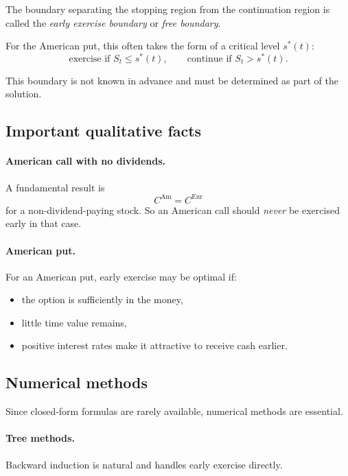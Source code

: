 \documentclass[11pt]{article}
\newcommand{\1}{\mathbf{1}}
\theoremstyle{plain}
\theoremstyle{definition}
\theoremstyle{remark}
\begin{document}
The boundary separating the stopping region from the continuation region is called the
\emph{early exercise boundary} or \emph{free boundary}.

For the American put, this often takes the form of a critical level \(s^*(t)\):
\[
\boxed{
\text{exercise if } S_t\le s^*(t),
\qquad
\text{continue if } S_t>s^*(t).
}
\]

This boundary is not known in advance and must be determined as part of the solution.

\subsection{Important qualitative facts}

\paragraph{American call with no dividends.}
A fundamental result is
\[
\boxed{
C^{\mathrm{Am}}=C^{\mathrm{Eur}}
}
\]
for a non-dividend-paying stock.
So an American call should \emph{never} be exercised early in that case.

\paragraph{American put.}
For an American put, early exercise may be optimal if:
\begin{itemize}[leftmargin=1.4em]
\item the option is sufficiently in the money,
\item little time value remains,
\item positive interest rates make it attractive to receive cash earlier.
\end{itemize}

\subsection{Numerical methods}

Since closed-form formulas are rarely available, numerical methods are essential.

\paragraph{Tree methods.}
Backward induction is natural and handles early exercise directly.
\end{document}
